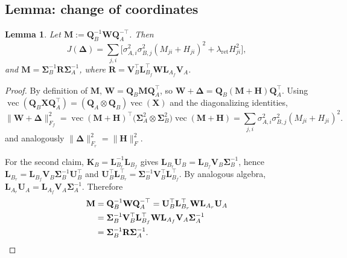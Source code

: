 \documentclass[11pt]{article}
\newtheorem{lemma}{Lemma}
\begin{document}
\subsection{Lemma: change of coordinates}
\label{app:coordlemma}

\begin{lemma}
\label{lem:coords}
Let $\mathbf{M} := \mathbf{Q}_B^{-1}\mathbf{W}\mathbf{Q}_A^{-\top}$. Then
\[
J(\mathbf{\Delta}) = \sum_{j,i}\Big[\sigma_{A,i}^2\sigma_{B,j}^2(M_{ji}+H_{ji})^2 + \lambda_{\mathrm{ret}} H_{ji}^2\Big],
\]
and $\mathbf{M} = \mathbf{\Sigma}_B^{-1}\mathbf{R}\mathbf{\Sigma}_A^{-1}$, where $\mathbf{R} = \mathbf{V}_B^\top\mathbf{L}_{B_f}^\top\mathbf{W}\mathbf{L}_{A_f}\mathbf{V}_A$.
\end{lemma}

\begin{proof}
By definition of $\mathbf{M}$, $\mathbf{W} = \mathbf{Q}_B\mathbf{M}\mathbf{Q}_A^\top$, so $\mathbf{W}+\mathbf{\Delta} = \mathbf{Q}_B(\mathbf{M}+\mathbf{H})\mathbf{Q}_A^\top$. Using $\operatorname{vec}(\mathbf{Q}_B\mathbf{X}\mathbf{Q}_A^\top) = (\mathbf{Q}_A\otimes\mathbf{Q}_B)\operatorname{vec}(\mathbf{X})$ and the diagonalizing identities,
\begin{equation}
\lVert\mathbf{W}+\mathbf{\Delta}\rVert^2_{F_f}=
\operatorname{vec}(\mathbf{M}+\mathbf{H})^\top
\bigl(\mathbf{\Sigma}_A^2\otimes\mathbf{\Sigma}_B^2\bigr)\operatorname{vec}(\mathbf{M}+\mathbf{H}) =\sum_{j,i}
\sigma_{A,i}^2\sigma_{B,j}^2
(M_{ji}+H_{ji})^2 .
\end{equation}
and analogously $\lVert\mathbf{\Delta}\rVert^2_{F_r} = \lVert\mathbf{H}\rVert_F^2$.

For the second claim, $\mathbf{K}_B = \mathbf{L}_{B_r}^{-1}\mathbf{L}_{B_f}$ gives $\mathbf{L}_{B_r}\mathbf{U}_B = \mathbf{L}_{B_f}\mathbf{V}_B\mathbf{\Sigma}_B^{-1}$, hence $\mathbf{L}_{B_r} = \mathbf{L}_{B_f}\mathbf{V}_B\mathbf{\Sigma}_B^{-1}\mathbf{U}_B^\top$ and $\mathbf{U}_B^\top\mathbf{L}_{B_r}^\top = \mathbf{\Sigma}_B^{-1}\mathbf{V}_B^\top\mathbf{L}_{B_f}^\top$. By analogous algebra, $\mathbf{L}_{A_r}\mathbf{U}_A = \mathbf{L}_{A_f}\mathbf{V}_A\mathbf{\Sigma}_A^{-1}$. Therefore
\begin{align*}
\mathbf{M} &= \mathbf{Q}_B^{-1}\mathbf{W}\mathbf{Q}_A^{-\top} = \mathbf{U}_B^\top\mathbf{L}_{B_r}^\top\mathbf{W}\mathbf{L}_{A_r}\mathbf{U}_A \\
&= \mathbf{\Sigma}_B^{-1}\mathbf{V}_B^\top\mathbf{L}_{B_f}^\top\mathbf{W}\mathbf{L}_{A_f}\mathbf{V}_A\mathbf{\Sigma}_A^{-1} \\
&= \mathbf{\Sigma}_B^{-1}\mathbf{R}\mathbf{\Sigma}_A^{-1}. \qedhere
\end{align*}
\end{proof}
\end{document}
